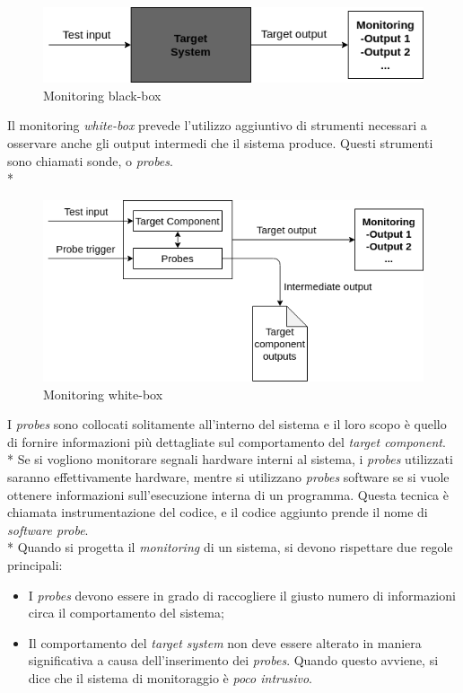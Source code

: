 \begin{figure}[h]
	\centering
	\includegraphics[width=0.7\linewidth]{img/blackbox}
	\caption{Monitoring black-box}
	\label{fig:blackbox}
\end{figure}
\FloatBarrier
Il monitoring \emph{white-box} prevede l'utilizzo aggiuntivo di strumenti necessari a osservare anche gli output intermedi che il sistema produce. Questi strumenti sono chiamati sonde, o \emph{probes}.\\*
\begin{figure}[h]
	\centering
	\includegraphics[width=0.7\linewidth]{img/whitebox}
	\caption{Monitoring white-box}
	\label{fig:whitebox}
\end{figure}
\FloatBarrier
I \emph{probes} sono collocati solitamente all'interno del sistema e il loro scopo \`e quello di fornire informazioni pi\`u dettagliate sul comportamento del \emph{target component}.\\*
Se si vogliono monitorare segnali hardware interni al sistema, i \emph{probes} utilizzati saranno effettivamente hardware, mentre si utilizzano \emph{probes} software se si vuole ottenere informazioni sull'esecuzione interna di un programma. Questa tecnica \`e chiamata instrumentazione del codice, e il codice aggiunto prende il nome di \emph{software probe}.\\*
Quando si progetta il \emph{monitoring} di un sistema, si devono rispettare due regole principali:
\begin{itemize}
	\item I \emph{probes} devono essere in grado di raccogliere il giusto numero di informazioni circa il comportamento del sistema;
	\item Il comportamento del \emph{target system} non deve essere alterato in maniera significativa a causa dell'inserimento dei \emph{probes}. Quando questo avviene, si dice che il sistema di monitoraggio \`e \emph{poco intrusivo}.
\end{itemize}
